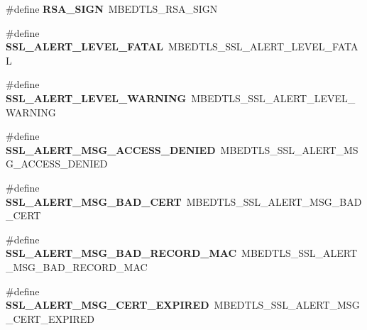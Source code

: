 \begin{DoxyCompactItemize}
\item 
\mbox{\label{compat-1_83_8h_ae1bbc14f00a5c873d7770b44c412df1d}} 
\#define {\bfseries R\+S\+A\+\_\+\+S\+I\+GN}~M\+B\+E\+D\+T\+L\+S\+\_\+\+R\+S\+A\+\_\+\+S\+I\+GN
\item 
\mbox{\label{compat-1_83_8h_a7aada6071810eba54885ae8ba9012a14}} 
\#define {\bfseries S\+S\+L\+\_\+\+A\+L\+E\+R\+T\+\_\+\+L\+E\+V\+E\+L\+\_\+\+F\+A\+T\+AL}~M\+B\+E\+D\+T\+L\+S\+\_\+\+S\+S\+L\+\_\+\+A\+L\+E\+R\+T\+\_\+\+L\+E\+V\+E\+L\+\_\+\+F\+A\+T\+AL
\item 
\mbox{\label{compat-1_83_8h_a3f8f7ea03f02f45a427379d17c0c3381}} 
\#define {\bfseries S\+S\+L\+\_\+\+A\+L\+E\+R\+T\+\_\+\+L\+E\+V\+E\+L\+\_\+\+W\+A\+R\+N\+I\+NG}~M\+B\+E\+D\+T\+L\+S\+\_\+\+S\+S\+L\+\_\+\+A\+L\+E\+R\+T\+\_\+\+L\+E\+V\+E\+L\+\_\+\+W\+A\+R\+N\+I\+NG
\item 
\mbox{\label{compat-1_83_8h_a00a2f8661c31e2e1211e0586398d3f3d}} 
\#define {\bfseries S\+S\+L\+\_\+\+A\+L\+E\+R\+T\+\_\+\+M\+S\+G\+\_\+\+A\+C\+C\+E\+S\+S\+\_\+\+D\+E\+N\+I\+ED}~M\+B\+E\+D\+T\+L\+S\+\_\+\+S\+S\+L\+\_\+\+A\+L\+E\+R\+T\+\_\+\+M\+S\+G\+\_\+\+A\+C\+C\+E\+S\+S\+\_\+\+D\+E\+N\+I\+ED
\item 
\mbox{\label{compat-1_83_8h_ab0fc5a1e3b26c77591deb67d4c0265b7}} 
\#define {\bfseries S\+S\+L\+\_\+\+A\+L\+E\+R\+T\+\_\+\+M\+S\+G\+\_\+\+B\+A\+D\+\_\+\+C\+E\+RT}~M\+B\+E\+D\+T\+L\+S\+\_\+\+S\+S\+L\+\_\+\+A\+L\+E\+R\+T\+\_\+\+M\+S\+G\+\_\+\+B\+A\+D\+\_\+\+C\+E\+RT
\item 
\mbox{\label{compat-1_83_8h_a736fe8af8eab0091654f5ee538f54822}} 
\#define {\bfseries S\+S\+L\+\_\+\+A\+L\+E\+R\+T\+\_\+\+M\+S\+G\+\_\+\+B\+A\+D\+\_\+\+R\+E\+C\+O\+R\+D\+\_\+\+M\+AC}~M\+B\+E\+D\+T\+L\+S\+\_\+\+S\+S\+L\+\_\+\+A\+L\+E\+R\+T\+\_\+\+M\+S\+G\+\_\+\+B\+A\+D\+\_\+\+R\+E\+C\+O\+R\+D\+\_\+\+M\+AC
\item 
\mbox{\label{compat-1_83_8h_a08cedd5d2c7b75509aec63668f02dfcd}} 
\#define {\bfseries S\+S\+L\+\_\+\+A\+L\+E\+R\+T\+\_\+\+M\+S\+G\+\_\+\+C\+E\+R\+T\+\_\+\+E\+X\+P\+I\+R\+ED}~M\+B\+E\+D\+T\+L\+S\+\_\+\+S\+S\+L\+\_\+\+A\+L\+E\+R\+T\+\_\+\+M\+S\+G\+\_\+\+C\+E\+R\+T\+\_\+\+E\+X\+P\+I\+R\+ED
\item 

\end{DoxyCompactItemize}

